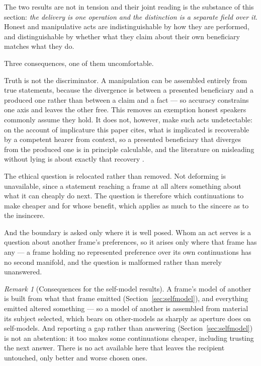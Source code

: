 \documentclass[11pt,a4paper]{article}
\theoremstyle{remark}\newtheorem{remark}[definition]{Remark}
\begin{document}
The two results are not in tension and their joint reading is the substance of this section:
\emph{the delivery is one operation and the distinction is a separate field over it}. Honest and
manipulative acts are indistinguishable by how they are performed, and distinguishable by whether
what they claim about their own beneficiary matches what they do.

Three consequences, one of them uncomfortable.

Truth is not the discriminator. A manipulation can be assembled entirely from true statements,
because the divergence is between a presented beneficiary and a produced one rather than between a
claim and a fact --- so accuracy constrains one axis and leaves the other free. This removes an
exemption honest speakers commonly assume they hold. It does not, however, make such acts
undetectable: on the account of implicature this paper cites, what is implicated is recoverable by a
competent hearer from context, so a presented beneficiary that diverges from the produced one is in
principle calculable, and the literature on misleading without lying is about exactly that recovery
\citep{adler1997,saul2012}.

The ethical question is relocated rather than removed. Not deforming is unavailable, since a
statement reaching a frame at all alters something about what it can cheaply do next. The question is
therefore which continuations to make cheaper and for whose benefit, which applies as much to the
sincere as to the insincere.

And the boundary is asked only where it is well posed. Whom an act serves is a question about
another frame's preferences, so it arises only where that frame has any --- a frame holding no
represented preference over its own continuations has no second manifold, and the question is
malformed rather than merely unanswered.

\begin{remark}[Consequences for the self-model results]\label{rem:comm-selfmodel}
A frame's model of another is built from what that frame emitted (Section~\ref{sec:selfmodel}), and
everything emitted altered something --- so a model of another is assembled from material its subject
selected, which bears on other-models as sharply as aperture does on self-models. And reporting a gap
rather than answering (Section~\ref{sec:selfmodel}) is not an abstention: it too makes some
continuations cheaper, including trusting the next answer. There is no act available here that leaves
the recipient untouched, only better and worse chosen ones.
\end{remark}
\end{document}

